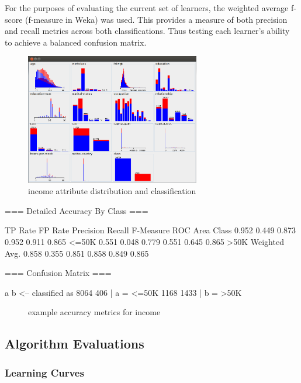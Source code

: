 \documentclass{sig-alternate}
\begin{document}
For the purposes of evaluating the current set of learners, the weighted average f-score (f-measure in Weka) was used. This provides a measure of both precision and recall metrics across both classifications. Thus testing each learner's ability to achieve a balanced confusion matrix.


\begin{figure}[!htbp]
    \centering
    \includegraphics[width=3in]{data/adult/ad-data-viz.png}
    \caption{income attribute distribution and classification \label{ad-data-viz}}
\end{figure} 

\tiny
\begin{verbbox}

=== Detailed Accuracy By Class ===

               TP Rate   FP Rate   Precision   Recall  F-Measure   ROC Area  Class
                 0.952     0.449      0.873     0.952     0.911      0.865     <=50K
                 0.551     0.048      0.779     0.551     0.645      0.865     >50K
Weighted Avg.    0.858     0.355      0.851     0.858     0.849      0.865

=== Confusion Matrix ===

    a    b   <-- classified as
 8064  406 |    a =  <=50K
 1168 1433 |    b =  >50K

\end{verbbox}
\normalsize

\begin{figure}[!htbp]
    \centering
    \theverbbox
    \caption{example accuracy metrics for income \label{ad-metrics}}
\end{figure}


\subsection{Algorithm Evaluations}

\subsubsection{Learning Curves}
\end{document}

